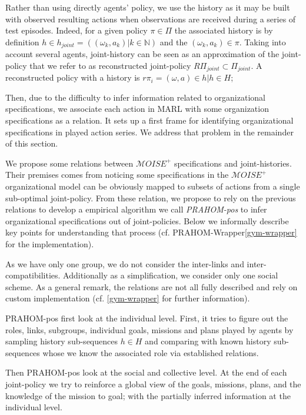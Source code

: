 \documentclass[runningheads]{llncs}
\newcounter{relation}
\begin{document}
Rather than using directly agents' policy, we use the history as it may be built with observed resulting actions when observations are received during a series of test episodes. Indeed, for a given policy $\pi \in \Pi$ the associated history is by definition $h \in h_{joint} = ((\omega_k,a_k) | k \in \mathbb{N})$ and the $(\omega_k,a_k) \in \pi$. Taking into account several agents, joint-history can be seen as an approximation of the joint-policy that we refer to as reconstructed joint-policy $R\Pi_{joint} \subset \Pi_{joint}$. A reconstructed policy with a history is $r\pi_i = {(\omega, a) \in h | h \in H}$;

Then, due to the difficulty to infer information related to organizational specifications, we associate each action in MARL with some organization specifications as a  relation. It sets up a first frame for identifying organizational specifications in played action series. We address that problem in the remainder of this section.

We propose some relations between $\mathcal{M}OISE^+$ specifications and joint-histories. Their premises comes from noticing some specifications in the $\mathcal{M}OISE^+$ organizational model can be obviously mapped to subsets of actions from a single sub-optimal joint-policy.
From these relation, we propose to rely on the previous relations to develop a empirical algorithm we call \emph{PRAHOM-pos} to infer organizational specifications out of joint-policies. Below we informally describe key points for understanding that process (cf. PRAHOM-Wrapper\ref{gym-wrapper} for the implementation).

As we have only one group, we do not consider the inter-links and inter-compatibilities. Additionally as a simplification, we consider only one social scheme. As a general remark, the  relations are not all fully described and rely on custom implementation (cf. \autoref{gym-wrapper} for further information).

PRAHOM-pos first look at the individual level.
First, it tries to figure out the roles, links, subgroups, individual goals, missions and plans played by agents by sampling history sub-sequences $h \in H$ and comparing with known history sub-sequences whose we know the associated role via established relations.

Then PRAHOM-pos look at the social and collective level.
At the end of each joint-policy we try to reinforce a global view of the goals, missions, plans, and the knowledge of the mission to goal; with the partially inferred information at the individual level.
\end{document}
